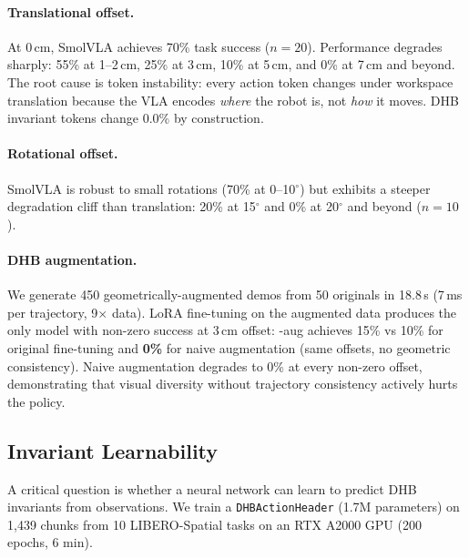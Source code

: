 \paragraph{Translational offset.}
At 0\,cm, SmolVLA achieves 70\% task success ($n{=}20$). Performance degrades
sharply: 55\% at 1--2\,cm, 25\% at 3\,cm, 10\% at 5\,cm, and 0\% at 7\,cm
and beyond. The root cause is token instability: every action token changes
under workspace translation because the VLA encodes \emph{where} the robot is,
not \emph{how} it moves. DHB invariant tokens change 0.0\% by construction.

\paragraph{Rotational offset.}
SmolVLA is robust to small rotations (70\% at 0--10$^\circ$) but exhibits a
steeper degradation cliff than translation: 20\% at 15$^\circ$ and 0\% at
20$^\circ$ and beyond ($n{=}10$).

\paragraph{DHB augmentation.}
We generate 450 geometrically-augmented demos from 50 originals in 18.8\,s
(7\,ms per trajectory, 9$\times$ data). LoRA fine-tuning on the augmented
data produces the only model with non-zero success at 3\,cm offset:
\dhb{}-aug achieves 15\% vs 10\% for original fine-tuning and \textbf{0\%}
for naive augmentation (same offsets, no geometric consistency). Naive
augmentation degrades to 0\% at every non-zero offset, demonstrating that
visual diversity without trajectory consistency actively hurts the policy.

\subsection{Invariant Learnability}

A critical question is whether a neural network can learn to predict DHB invariants
from observations. We train a \texttt{DHBActionHeader} (1.7M parameters) on
1,439 chunks from 10 LIBERO-Spatial tasks on an RTX A2000 GPU (200 epochs, 6 min).


